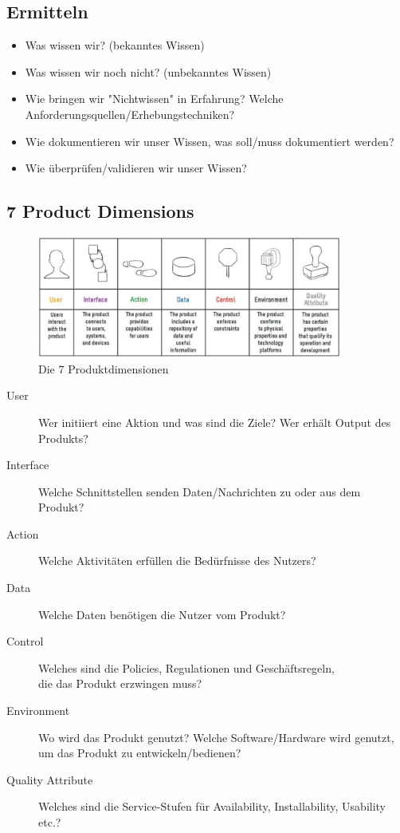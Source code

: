 \documentclass[a4paper]{article}
\begin{document}
\newpage
	
		\subsection{Ermitteln}
		
			\begin{itemize}
				\item Was wissen wir? (bekanntes Wissen)
				\item Was wissen wir noch nicht? (unbekanntes Wissen)
				\item Wie bringen wir "Nichtwissen" in Erfahrung? Welche Anforderungsquellen/Erhebungstechniken?
				\item Wie dokumentieren wir unser Wissen, was soll/muss dokumentiert werden?
				\item Wie überprüfen/validieren wir unser Wissen?
			\end{itemize}
	
		\subsection{7 Product Dimensions}
		
		\begin{figure}[!htb]
			\centering
			\includegraphics[height=4cm]{img/re/02/product_dimensions.png}
			\caption{Die 7 Produktdimensionen}
			\label{fig:re_product_dimensions}
		\end{figure}
	
		\begin{description}
			\item[User] Wer initiiert eine Aktion und was sind die Ziele? Wer erhält Output des Produkts?
			\item[Interface] Welche Schnittstellen senden Daten/Nachrichten zu oder aus dem Produkt?
			\item[Action] Welche Aktivitäten erfüllen die Bedürfnisse des Nutzers?
			\item[Data] Welche Daten benötigen die Nutzer vom Produkt?
			\item[Control] Welches sind die Policies, Regulationen und Geschäftsregeln, \\
				die das Produkt erzwingen muss?
			\item[Environment] Wo wird das Produkt genutzt? Welche Software/Hardware wird genutzt, \\
				um das Produkt zu entwickeln/bedienen?
			\item[Quality Attribute] Welches sind die Service-Stufen für Availability, Installability, Usability etc.?
		\end{description}
	
\end{document}
